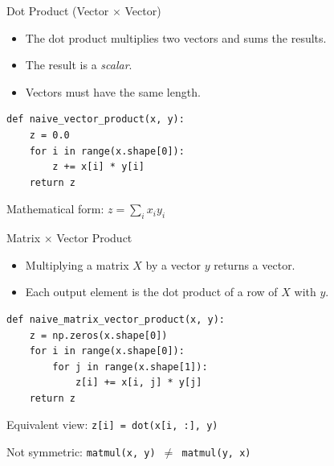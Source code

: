 \documentclass{beamer}
\begin{document}
\begin{frame}[fragile]{Dot Product (Vector $\times$ Vector)}
    \begin{itemize}
        \item The dot product multiplies two vectors and sums the results.
        \item The result is a \textit{scalar}.
        \item Vectors must have the same length.
    \end{itemize}

    \begin{center}
        \begin{tcolorbox}[
                width=0.75\textwidth,
                colback=gray!5,
                colframe=gray!60,
                boxrule=0.4pt,
                arc=3pt,
                left=6pt,right=6pt,top=6pt,bottom=6pt
            ]
            \begin{verbatim}
def naive_vector_product(x, y):
    z = 0.0
    for i in range(x.shape[0]):
        z += x[i] * y[i]
    return z
\end{verbatim}
        \end{tcolorbox}
    \end{center}

    \vspace{0.5em}
    \small Mathematical form: $z = \sum_i x_i y_i$
\end{frame}

\begin{frame}[fragile]{Matrix $\times$ Vector Product}
    \begin{itemize}
        \item Multiplying a matrix $X$ by a vector $y$ returns a vector.
        \item Each output element is the dot product of a row of $X$ with $y$.
    \end{itemize}

    \begin{center}
        \begin{tcolorbox}[
                width=0.78\textwidth,
                colback=gray!5,
                colframe=gray!60,
                boxrule=0.4pt,
                arc=3pt,
                left=6pt,right=6pt,top=6pt,bottom=6pt
            ]
            \begin{verbatim}
def naive_matrix_vector_product(x, y):
    z = np.zeros(x.shape[0])
    for i in range(x.shape[0]):
        for j in range(x.shape[1]):
            z[i] += x[i, j] * y[j]
    return z
\end{verbatim}
        \end{tcolorbox}
    \end{center}

    \vspace{0.5em}
    \small Equivalent view:
    \texttt{z[i] = dot(x[i, :], y)}

    \vspace{0.3em}
    \small Not symmetric: \texttt{matmul(x, y) $\neq$ matmul(y, x)}
\end{frame}
\end{document}

